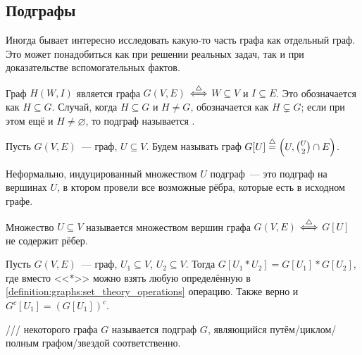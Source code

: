 \subsection{Подграфы}
\label{subsec:graphs:subgraphs}

Иногда бывает интересно исследовать какую-то часть графа как отдельный граф.
Это может понадобиться как при решении реальных задач, так и при доказательстве вспомогательных фактов.

\begin{definition}
    \label{definition:graphs:subgraph}
    Граф $ H(W, I) $ является  графа $ G(V, E) $ $ \overset{\triangle}{\Longleftrightarrow} $ $ W \subseteq V $ и $ I \subseteq E $.
    Это обозначается как $ H \subseteq G $.
    Случай, когда $ H \subseteq G $ и $ H \neq G $, обозначается как $ H \varsubsetneq G $;
    если при этом ещё и $ H \neq \varnothing $, то подграф называется .
\end{definition}

\begin{definition}
    Пусть $ G(V, E) $~--- граф, $ U \subseteq V $.
    Будем называть  граф $ G[U] \overset{\triangle}{=} \left( U, \binom{U}{2} \cap E \right) $.
\end{definition}

Неформально, индуцированный множеством $ U $ подграф~--- это подграф на вершинах $ U $, в ктором провели все возможные рёбра, которые есть в исходном графе.

\begin{definition}
    Множество $ U \subseteq V $ называется  множеством вершин графа $ G(V, E) $ $ \overset{\triangle}{\Longleftrightarrow} $ $ G[U] $ не содержит рёбер.
\end{definition}

\begin{statement}
    \label{statement:graphs:subgraph_set_theory_operations}
    Пусть $ G(V, E) $~--- граф, $ U_1 \subseteq V $, $ U_2 \subseteq V $.
    Тогда $ G[U_1 * U_2] = G[U_1] * G[U_2] $, где вместо <<$ * $>> можно взять любую определённую в \ref{definition:graphs:set_theory_operations} операцию.
    Также верно и $ G^c[U_1] = (G[U_1])^c $.
\end{statement}

\begin{definition}
    /// некоторого графа $ G $ называется подграф $ G $,
    являющийся путём/циклом/полным графом/звездой соответственно.
\end{definition}

